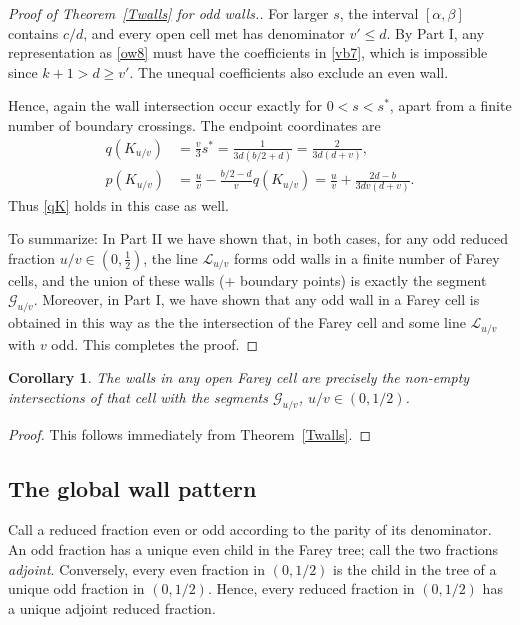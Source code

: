 \documentclass[11pt,reqno,tbtags,a4paper]{amsart}
\numberwithin{equation}{section}
\renewcommand\le{\leq}
\renewcommand\ge{\geq}
\renewcommand\leq{\leqslant}
\renewcommand\geq{\geqslant}
\theoremstyle{plain}%
\newtheorem{corollary}[theorem]{Corollary}
\theoremstyle{definition}
\theoremstyle{remark}
\newcounter{cases}
\newcommand{\refT}[1]{Theorem~\ref{#1}}
\newcounter{cc}
\newcommand\ga{\alpha}
\newcommand\gb{\beta}
\newcommand\LL{{\mathcal L}}
\newcommand\LG{{\mathcal G}} %
\newcommand\uv{_{u/v}}
\newcommand\sx{s^*}
\newcommand\0{{\boldsymbol 0}}
\newcommand\1{{\boldsymbol 1}}
\begin{document}
\begin{proof}[Proof of \refT{Twalls} for odd walls.]
For larger $s$, the interval $[\ga,\gb]$ contains $c/d$, and every open cell met
has denominator $v'\le d$. 
By Part I, any representation as \eqref{ow8} must have the
coefficients in \eqref{vb7}, which is impossible since $k+1>d\ge v'$.
The unequal coefficients also exclude an even wall.

Hence, again the wall intersection occur exactly for $0<s<\sx$, apart from a
finite number of boundary crossings.
The endpoint coordinates are
\begin{align}
 q(K\uv)&=\frac{v}{3}\sx
 =\frac{1}{3d(b/2+d)}
 =\frac{2}{3d(d+v)},\label{vb10}\\
 p(K\uv)&=\frac uv-\frac{b/2-d}{v}q(K\uv)
 =\frac uv+\frac{2d-b}{3dv(d+v)}.\label{vb11}
\end{align}
Thus \eqref{qK} holds in this case as well.

To summarize: 
In Part II we have shown that, in both cases, 
for any odd reduced fraction $u/v\in(0,\frac12)$, 
the line $\LL\uv$ forms odd walls in a finite number of Farey cells, and the
union of these walls (+ boundary points) is exactly the segment  $\LG\uv$.
Moreover,
in Part I, we have shown that any odd wall in a Farey cell is 
obtained in this way as the the intersection of the Farey cell and some line
$\LL\uv$ with $v$ odd. 
This completes the proof.
%
%
%
%
%
%
%
%
%
%
%
\end{proof}

\begin{corollary}\label{Cwalls}
The walls in any open Farey cell are precisely the non-empty
intersections of that cell with the segments $\LG_{u/v}$,
$u/v\in(0,1/2)$.
\end{corollary}

\begin{proof}
  This follows immediately from \refT{Twalls}.
\end{proof}


\subsection{The global wall pattern}\label{SSm3-wall-pattern}

Call a reduced fraction even or odd according to the parity of its
denominator. An odd fraction has a unique even child in the Farey tree;
call the two fractions \emph{adjoint}.
Conversely, every even fraction in $(0,1/2)$ is the child in the tree
of a unique odd fraction in $(0,1/2)$.
Hence, every reduced fraction in $(0,1/2)$ has a unique adjoint reduced
fraction.
\end{document}
